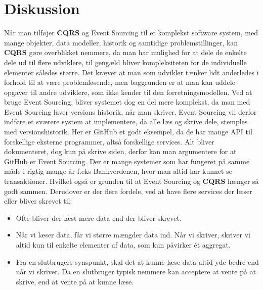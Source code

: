 \chapter{Diskussion}
Når man tilføjer \textbf{CQRS} og Event Sourcing til et komplekst software system, med mange objekter, data modeller, historik og samtidige problemstillinger, kan \textbf{CQRS} gøre overblikket nemmere, da man har mulighed for at dele de enkelte dele ud til flere udviklere, til gengæld bliver kompleksiteten for de individuelle elementer således større.
Det kræver at man som udvikler tænker lidt anderledes i forhold til at være problemløsende, men baggrunden er at man kan uddele opgaver til andre udviklere, som ikke kender til den forretningsmodellen.
Ved at bruge Event Sourcing, bliver systemet dog en del mere komplekst, da man med Event Sourcing laver versions historik, når man skriver. Event Sourcing vil derfor indføre et sværere system at implementere, da alle læs og skrive dele, stemples med versionshistorik. Her er GitHub et godt eksempel, da de har mange API til forskellige eksterne programmer, altså forskellige services. Alt bliver dokumenteret, dog kun på skrive siden, derfor kan man argumentere for at GitHub er Event Sourcing.
Der er mange systemer som har fungeret på samme måde i rigtig mange år f.eks Bankverdenen, hvor man altid har kunnet se transaktioner.
Hvilket også er grunden til at Event Sourcing og \textbf{CQRS} hænger så godt sammen.
\newline
Derudover er der flere fordele, ved at have flere services der læser eller bliver skrevet til:
\begin{itemize}
    \item Ofte bliver der læst mere data end der bliver skrevet.
    \item Når vi læser data, får vi større mængder data ind. Når vi skriver, skriver vi altid kun til enkelte elementer af data, som kun påvirker ét aggregat.
    \item Fra en slutbrugers synspunkt, skal det at kunne læse data altid yde bedre end når vi skriver. Da en slutbruger typisk nemmere kan acceptere at vente på at skrive, end at vente på at kunne læse.
\end{itemize}

